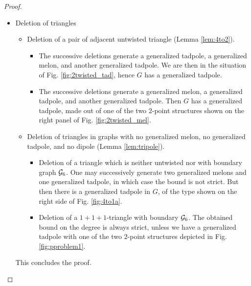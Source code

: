 \documentclass[10pt]{article}
\theoremstyle{plain}
\theoremstyle{definition}
\newcommand{\cG}{{\cal G}}
\begin{document}
\begin{proof}
\begin{itemize}
\item Deletion of triangles
\begin{itemize}
\item Deletion of a pair of adjacent untwisted triangle (Lemma \ref{lem:4to2}).
\begin{itemize}
\item The successive deletions generate a generalized tadpole, a generalized melon, and another generalized tadpole. We are then in the situation of Fig. \ref{fig:2twisted_tad}, hence $G$ has a generalized tadpole. 
\item The successive deletions generate a generalized melon, a generalized tadpole, and another generalized tadpole. Then $G$ has a generalized tadpole, made out of one of the two $2$-point structures shown on the right panel of Fig. \ref{fig:2twisted_mel}. 
\end{itemize}
\item Deletion of triangles in graphs with no generalized melon, no generalized tadpole, and no dipole (Lemma \ref{lem:tripole}).
\begin{itemize}
\item Deletion of a triangle which is neither untwisted nor with boundary graph $\cG_6$. One may successively generate two generalized melons and one generalized tadpole, in which case the bound is not strict. But then there is a generalized tadpole in $G$, of the type shown on the right side of Fig. \ref{fig:4to1a}.
\item Deletion of a $1+1+1$-triangle with boundary $\cG_6$. The obtained bound on the degree is always strict, unless we have a generalized tadpole with one of the two $2$-point structures depicted in Fig. \ref{fig:pproblem1}.
\end{itemize}
\end{itemize}
This concludes the proof. 
\end{itemize}

\end{proof}

\
\end{document}
